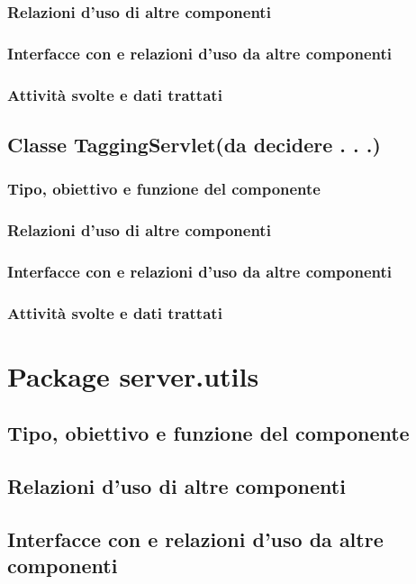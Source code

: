 \subsubsection*{Relazioni d'uso di altre componenti}
\subsubsection*{Interfacce con e relazioni d'uso da altre componenti}
\subsubsection*{Attivit\`a svolte e dati trattati}

\newpage
\subsection{Classe TaggingServlet(da decidere . . .)}
\subsubsection*{Tipo, obiettivo e funzione del componente}
\subsubsection*{Relazioni d'uso di altre componenti}
\subsubsection*{Interfacce con e relazioni d'uso da altre componenti}
\subsubsection*{Attivit\`a svolte e dati trattati}

\section{Package server.utils} %
\subsection*{Tipo, obiettivo e funzione del componente}
\subsection*{Relazioni d'uso di altre componenti}
\subsection*{Interfacce con e relazioni d'uso da altre componenti}
